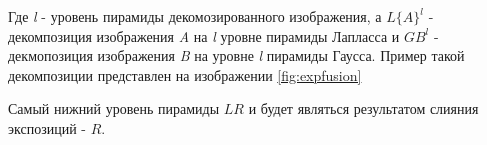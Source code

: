 Где \textit{l} - уровень пирамиды декомозированного изображения, а \textit{$L\{A\}^l$} - декомпозиция изображения \textit{A} на \textit{l} уровне пирамиды Лапласса и $G{B}^l$ - декмопозиция изображения \textit{B} на уровне \textit{l} пирамиды Гаусса. Пример такой декомпозиции представлен на изображении \ref{fig:expfusion}

\begin{figure}[ht!]
\end{figure}

Самый нижний уровень пирамиды $L{R}$ и будет являться результатом слияния экспозиций - $R$.
